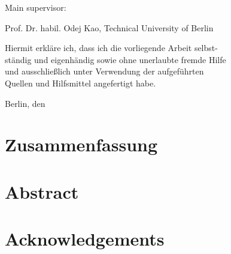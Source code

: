 \rule{0cm}{20cm}

\noindent Main supervisor: 

\noindent Prof. Dr. habil. Odej Kao, Technical University of Berlin

\thispagestyle{empty}

\rule{0cm}{10cm}

\noindent Hiermit erkl\"are ich, dass ich die vorliegende Arbeit selbst-\\
st\"andig und eigenh\"andig sowie ohne unerlaubte fremde Hilfe \\
und ausschlie{\ss}lich unter Verwendung der aufgef\"uhrten \\
Quellen und Hilfsmittel angefertigt habe.
\vspace{1cm}

\noindent Berlin, den


\thispagestyle{empty}




\chapter*{Zusammenfassung}

\abstracttextde

\thispagestyle{empty}
\newpage
\vspace*{3cm}
\thispagestyle{empty}

\chapter*{Abstract}

\abstracttext

\thispagestyle{empty}
\newpage
\vspace*{3cm}
\thispagestyle{empty}

\chapter*{Acknowledgements}

\acktext


\thispagestyle{empty}
\newpage
\vspace*{3cm}
\thispagestyle{empty}



\setcounter{page}{8}
\tableofcontents

\newpage


\listoffigures
\listoftables
\Listofabbrev
\newpage
\thispagestyle{empty}
\newpage
\vspace*{3cm}
\thispagestyle{empty} \newpage
{}\setcounter{page}{1}